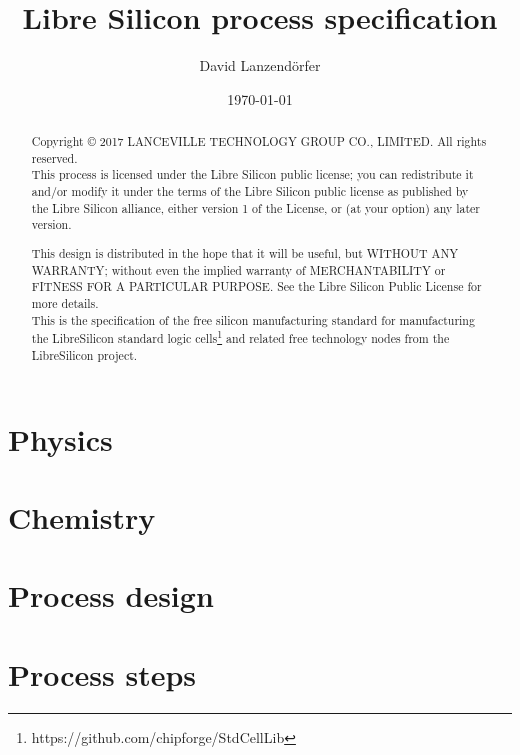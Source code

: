 \documentclass[10pt,a4paper,oneside]{article}
\title{Libre Silicon process specification}
\date{\today}
\author{David Lanzendörfer}
\newcounter{ct}
\begin{document}
\maketitle

\begin{abstract}
	Copyright © 2017 LANCEVILLE TECHNOLOGY GROUP CO., LIMITED. All rights reserved. \\

	This process is licensed under the Libre Silicon public license; you can redistribute it and/or modify it under the terms of the Libre Silicon public license
	as published by the Libre Silicon alliance, either version 1 of the License, or (at your option) any later version.

	This design is distributed in the hope that it will be useful, but WITHOUT ANY WARRANTY; without even the implied warranty of MERCHANTABILITY or FITNESS FOR A PARTICULAR PURPOSE.
	See the Libre Silicon Public License for more details. \\

	This is the specification of the free silicon manufacturing standard for manufacturing the LibreSilicon standard logic cells\footnote{https://github.com/chipforge/StdCellLib} and related free technology nodes from the LibreSilicon project.
\end{abstract}

\newpage
\tableofcontents
\newpage

\newpage
\section{Physics}

\newpage




\newpage
\section{Chemistry}


\newpage
\section{Process design}








\newpage
\section{Process steps}
\label{process_overview}
\newpage

\newpage

\newpage

\newpage

\newpage

\newpage

\newpage

\newpage

\newpage

\end{document}
